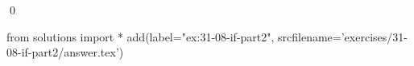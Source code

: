 
\begin{ex}
  \label{ex:31-08-if-part2}
  
  \qed
\end{ex}
\begin{python0}
from solutions import *
add(label="ex:31-08-if-part2",
    srcfilename='exercises/31-08-if-part2/answer.tex')
\end{python0}
